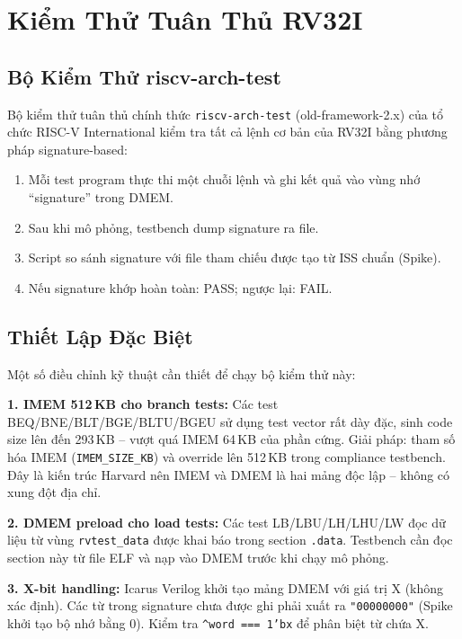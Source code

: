 \section{Kiểm Thử Tuân Thủ RV32I}

\subsection{Bộ Kiểm Thử riscv-arch-test}

Bộ kiểm thử tuân thủ chính thức \texttt{riscv-arch-test} (old-framework-2.x) của tổ chức RISC-V International \cite{riscv-arch-test} kiểm tra tất cả lệnh cơ bản của RV32I bằng phương pháp signature-based:

\begin{enumerate}
    \item Mỗi test program thực thi một chuỗi lệnh và ghi kết quả vào vùng nhớ ``signature'' trong DMEM.
    \item Sau khi mô phỏng, testbench dump signature ra file.
    \item Script so sánh signature với file tham chiếu được tạo từ ISS chuẩn (Spike).
    \item Nếu signature khớp hoàn toàn: PASS; ngược lại: FAIL.
\end{enumerate}

\subsection{Thiết Lập Đặc Biệt}

Một số điều chỉnh kỹ thuật cần thiết để chạy bộ kiểm thử này:

\textbf{1. IMEM 512\,KB cho branch tests:} Các test BEQ/BNE/BLT/BGE/BLTU/BGEU sử dụng test vector rất dày đặc, sinh code size lên đến 293\,KB -- vượt quá IMEM 64\,KB của phần cứng. Giải pháp: tham số hóa IMEM (\texttt{IMEM\_SIZE\_KB}) và override lên 512\,KB trong compliance testbench. Đây là kiến trúc Harvard nên IMEM và DMEM là hai mảng độc lập -- không có xung đột địa chỉ.

\textbf{2. DMEM preload cho load tests:} Các test LB/LBU/LH/LHU/LW đọc dữ liệu từ vùng \texttt{rvtest\_data} được khai báo trong section \texttt{.data}. Testbench cần đọc section này từ file ELF và nạp vào DMEM trước khi chạy mô phỏng.

\textbf{3. X-bit handling:} Icarus Verilog khởi tạo mảng DMEM với giá trị X (không xác định). Các từ trong signature chưa được ghi phải xuất ra \texttt{"00000000"} (Spike khởi tạo bộ nhớ bằng 0). Kiểm tra \texttt{\^{}word === 1'bx} để phân biệt từ chứa X.

